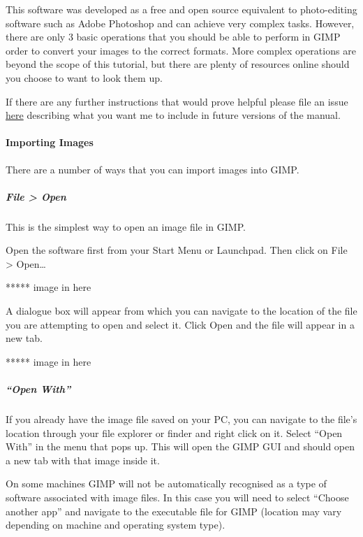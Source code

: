 \documentclass[]{book}
\let\oldparagraph\paragraph
\renewcommand{\paragraph}[1]{\oldparagraph{#1}\mbox{}}
\let\oldsubparagraph\subparagraph
\renewcommand{\subparagraph}[1]{\oldsubparagraph{#1}\mbox{}}
\begin{document}
This software was developed as a free and open source equivalent to
photo-editing software such as Adobe Photoshop and can achieve very
complex tasks. However, there are only 3 basic operations that you
should be able to perform in GIMP order to convert your images to the
correct formats. More complex operations are beyond the scope of this
tutorial, but there are plenty of resources online should you choose to
want to look them up.

If there are any further instructions that would prove helpful please
file an issue
\href{https://github.com/RebeccaJLai/exp_manual/issues}{here} describing
what you want me to include in future versions of the manual.

\paragraph{Importing Images}\label{importing-images}

There are a number of ways that you can import images into GIMP.

\subparagraph{File \textgreater{} Open}\label{file-open}

This is the simplest way to open an image file in GIMP.

Open the software first from your Start Menu or Launchpad. Then click on
File \textgreater{} Open\ldots{}

***** image in here

A dialogue box will appear from which you can navigate to the location
of the file you are attempting to open and select it. Click Open and the
file will appear in a new tab.

***** image in here

\subparagraph{\texorpdfstring{``Open
With''}{Open With}}\label{open-with}

If you already have the image file saved on your PC, you can navigate to
the file's location through your file explorer or finder and right click
on it. Select ``Open With'' in the menu that pops up. This will open the
GIMP GUI and should open a new tab with that image inside it.

On some machines GIMP will not be automatically recognised as a type of
software associated with image files. In this case you will need to
select ``Choose another app'' and navigate to the executable file for
GIMP (location may vary depending on machine and operating system type).
\end{document}
